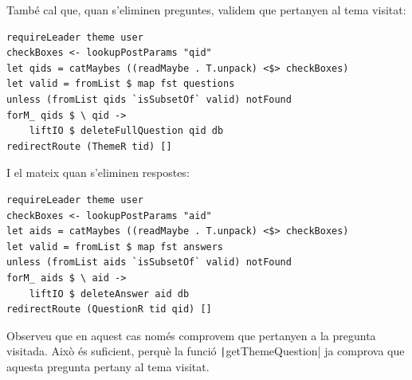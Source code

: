\documentclass[catalan, a4paper]{scrartcl}
\begin{document}
També cal que, quan s'eliminen preguntes, validem que
pertanyen al tema visitat:

\begin{verbatim}
requireLeader theme user
checkBoxes <- lookupPostParams "qid"
let qids = catMaybes ((readMaybe . T.unpack) <$> checkBoxes)
let valid = fromList $ map fst questions
unless (fromList qids `isSubsetOf` valid) notFound
forM_ qids $ \ qid ->
    liftIO $ deleteFullQuestion qid db
redirectRoute (ThemeR tid) []
\end{verbatim}

I el mateix quan s'eliminen respostes:

\begin{verbatim}
requireLeader theme user
checkBoxes <- lookupPostParams "aid"
let aids = catMaybes ((readMaybe . T.unpack) <$> checkBoxes)
let valid = fromList $ map fst answers
unless (fromList aids `isSubsetOf` valid) notFound
forM_ aids $ \ aid ->
    liftIO $ deleteAnswer aid db
redirectRoute (QuestionR tid qid) []
\end{verbatim}

Observeu que en aquest cas només comprovem
que pertanyen a la pregunta visitada. Això és suficient, perquè la funció
\texttt|getThemeQuestion| ja comprova que aquesta pregunta
pertany al tema visitat.
\end{document}
